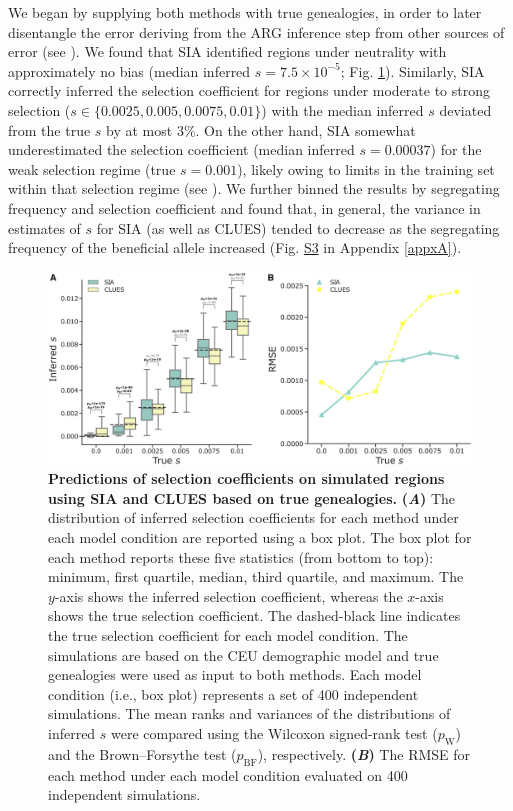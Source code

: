 We began by supplying both methods with true genealogies, in order to later disentangle the error deriving from the \ac{ARG} inference step from other sources of error (see ). We found that \ac{SIA} identified regions under neutrality with approximately no bias (median inferred $s=7.5\times 10^{-5}$; Fig. \ref{fig:SIA-F3}). Similarly, \ac{SIA} correctly inferred the selection coefficient for regions under moderate to strong selection ($s \in \{0.0025, 0.005, 0.0075, 0.01\}$) with the median inferred $s$ deviated from the true $s$ by at most 3\%. On the other hand, \ac{SIA} somewhat underestimated the selection coefficient (median inferred $s = 0.00037$) for the weak selection regime (true $s = 0.001$), likely owing to limits in the training set within that selection regime (see ). We further binned the results by segregating frequency and selection coefficient and found that, in general, the variance in estimates of $s$ for \ac{SIA} (as well as CLUES) tended to decrease as the segregating frequency of the beneficial allele increased (Fig. \href{https://academic.oup.com/mbe/article/39/1/msab332/6433161#supplementary-data}{S3} in Appendix \ref{appxA}).

\begin{figure}[h]
    \centering
    \includegraphics[width=\textwidth]{SIA_figs/SIA_F3.jpeg}
    \caption[Predictions of selection coefficients on simulated regions using \ac{SIA} and CLUES based on true genealogies.]{\textbf{Predictions of selection coefficients on simulated regions using \ac{SIA} and CLUES based on true genealogies.} \textbf{(\textit{A})} The distribution of inferred selection coefficients for each method under each model condition are reported using a box plot. The box plot for each method reports these five statistics (from bottom to top): minimum, first quartile, median, third quartile, and maximum. The $y$-axis shows the inferred selection coefficient, whereas the $x$-axis shows the true selection coefficient. The dashed-black line indicates the true selection coefficient for each model condition. The simulations are based on the CEU demographic model and true genealogies were used as input to both methods. Each model condition (i.e., box plot) represents a set of 400 independent simulations. The mean ranks and variances of the distributions of inferred $s$ were compared using the Wilcoxon signed-rank test ($p_\mathrm{W}$) and the Brown–Forsythe test ($p_{\mathrm{BF}}$), respectively. \textbf{(\textit{B})} The \acf{RMSE} for each method under each model condition evaluated on 400 independent simulations.}
    \label{fig:SIA-F3}
\end{figure}

